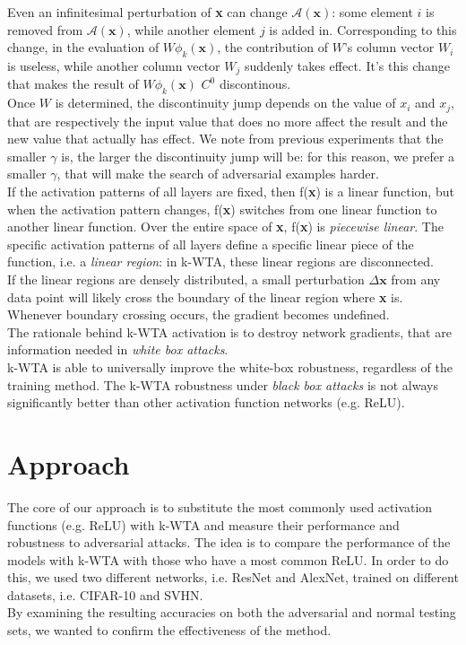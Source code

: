 \documentclass[a4paper]{article}
\begin{document}
	Even an infinitesimal perturbation of \textbf{x} can change $\mathcal{A}(\textbf{x})$: some element $i$ is removed from $\mathcal{A}(\textbf{x})$, while another element $j$ is added in. Corresponding to this change, in the evaluation of $W\phi_{k}(\textbf{x})$, the contribution of $W$'s column vector $W_{i}$ is useless, while another column vector $W_{j}$ suddenly takes effect. It's this change that makes the result of $W\phi_{k}(\textbf{x})$ $C^0$ discontinous.\\
	Once $W$ is determined, the discontinuity jump depends on the value of $x_i$ and $x_j$, that are respectively the input value that does no more affect the result and the new value that actually has effect. We note from previous experiments that the smaller $\gamma$ is, the larger the discontinuity jump will be: for this reason, we prefer a smaller $\gamma$, that will make the search of adversarial examples harder.\\
	If the activation patterns of all layers are fixed, then f(\textbf{x}) is a linear function, but when the activation pattern changes, f(\textbf{x}) switches from one linear function to another linear function. Over the entire space of \textbf{x}, f(\textbf{x}) is \emph{piecewise linear}. The specific activation patterns of all layers define a specific linear piece of the function, i.e. a \emph{linear region}: in k-WTA, these linear regions are disconnected.\\
	If the linear regions are densely distributed, a small perturbation $\Delta\textbf{x}$ from any data point will likely cross the boundary of the linear region where \textbf{x} is. Whenever boundary crossing occurs, the gradient becomes undefined.\\
	The rationale behind k-WTA activation is to destroy network gradients, that are information needed in \emph{white box attacks}.\\
	k-WTA is able to universally improve the white-box robustness, regardless of the training method. The k-WTA robustness under \emph{black box attacks} is not always significantly better than other activation function networks (e.g. ReLU).
	
	\section{Approach}
	The core of our approach is to substitute the most commonly used activation functions (e.g. ReLU) with k-WTA and measure their performance and robustness to adversarial attacks.
	The idea is to compare the performance of the models with k-WTA with those who have a most common ReLU.
	In order to do this, we used two different networks, i.e. ResNet and AlexNet, trained on different datasets, i.e. CIFAR-10 and SVHN.\\
	By examining the resulting accuracies on both the adversarial and normal testing sets, we wanted to confirm the effectiveness of the method.
	
\end{document}
